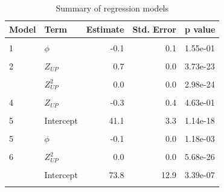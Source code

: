 \begin{table}

\caption{\label{tab:regSummary}Summary of regression models}
\centering
\begin{threeparttable}
\begin{tabular}[t]{llrrl}
\toprule
Model & Term & Estimate & Std. Error & p value\\
\midrule
\cellcolor{gray!6}{1} & \cellcolor{gray!6}{Intercept} & \cellcolor{gray!6}{89.4} & \cellcolor{gray!6}{3.7} & \cellcolor{gray!6}{2.24e-33}\\
1 & $\phi$ & -0.1 & 0.1 & 1.55e-01\\
\cellcolor{gray!6}{2} & \cellcolor{gray!6}{Intercept} & \cellcolor{gray!6}{36.4} & \cellcolor{gray!6}{3.2} & \cellcolor{gray!6}{7.15e-17}\\
2 & $Z_{UP}$ & 0.7 & 0.0 & 3.73e-23\\
\cellcolor{gray!6}{3} & \cellcolor{gray!6}{Intercept} & \cellcolor{gray!6}{58.9} & \cellcolor{gray!6}{1.7} & \cellcolor{gray!6}{1.43e-41}\\
\addlinespace
3 & $Z_{UP}^2$ & 0.0 & 0.0 & 2.98e-24\\
\cellcolor{gray!6}{4} & \cellcolor{gray!6}{Intercept} & \cellcolor{gray!6}{69.2} & \cellcolor{gray!6}{14.0} & \cellcolor{gray!6}{6.25e-06}\\
4 & $Z_{UP}$ & -0.3 & 0.4 & 4.63e-01\\
\cellcolor{gray!6}{4} & \cellcolor{gray!6}{$Z_{UP}^2$} & \cellcolor{gray!6}{0.0} & \cellcolor{gray!6}{0.0} & \cellcolor{gray!6}{1.95e-02}\\
5 & Intercept & 41.1 & 3.3 & 1.14e-18\\
\addlinespace
\cellcolor{gray!6}{5} & \cellcolor{gray!6}{$Z_{UP}$} & \cellcolor{gray!6}{0.7} & \cellcolor{gray!6}{0.0} & \cellcolor{gray!6}{1.12e-24}\\
5 & $\phi$ & -0.1 & 0.0 & 1.18e-03\\
\cellcolor{gray!6}{6} & \cellcolor{gray!6}{Intercept} & \cellcolor{gray!6}{63.6} & \cellcolor{gray!6}{2.1} & \cellcolor{gray!6}{8.29e-39}\\
6 & $Z_{UP}^2$ & 0.0 & 0.0 & 5.68e-26\\
\cellcolor{gray!6}{6} & \cellcolor{gray!6}{$\phi$} & \cellcolor{gray!6}{-0.1} & \cellcolor{gray!6}{0.0} & \cellcolor{gray!6}{6.98e-04}\\
\addlinespace
7 & Intercept & 73.8 & 12.9 & 3.39e-07\\
\cellcolor{gray!6}{7} & \cellcolor{gray!6}{$Z_{UP}$} & \cellcolor{gray!6}{-0.3} & \cellcolor{gray!6}{0.4} & \cellcolor{gray!6}{4.23e-01}\\

\end{tabular}
\end{threeparttable}
\end{table}

